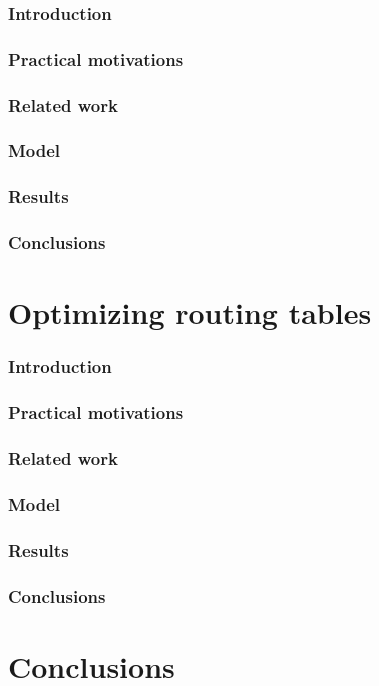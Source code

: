 \documentclass[a4paper]{article}
\begin{document}
\subsubsection{Introduction}
\subsubsection{Practical motivations}
\subsubsection{Related work}
\subsubsection{Model}
\subsubsection{Results}
\subsubsection{Conclusions}


\section{Optimizing routing tables}

\subsubsection{Introduction}
\subsubsection{Practical motivations}
\subsubsection{Related work}
\subsubsection{Model}
\subsubsection{Results}
\subsubsection{Conclusions}


\section{Conclusions}
\end{document}
